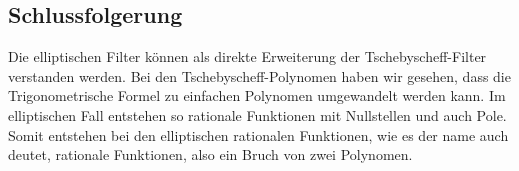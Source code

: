 %     

\subsection{Schlussfolgerung}

Die elliptischen Filter können als direkte Erweiterung der Tschebyscheff-Filter verstanden werden.
Bei den Tschebyscheff-Polynomen haben wir gesehen, dass die Trigonometrische Formel zu einfachen Polynomen umgewandelt werden kann.
Im elliptischen Fall entstehen so rationale Funktionen mit Nullstellen und auch Pole.
Somit entstehen bei den elliptischen rationalen Funktionen, wie es der name auch deutet, rationale Funktionen, also ein Bruch von zwei Polynomen.




